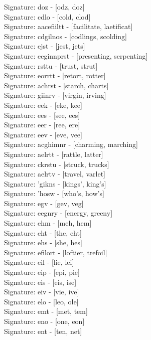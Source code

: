 Signature: {doz} - [odz, doz] \\
Signature: {cdlo} - [cold, clod] \\
Signature: {aacefiiltt} - [facilitate, laetificat] \\
Signature: {cdgilnos} - [codlings, scolding] \\
Signature: {ejst} - [jest, jets] \\
Signature: {eeginnprst} - [presenting, serpenting] \\
Signature: {rsttu} - [trust, strut] \\
Signature: {eorrtt} - [retort, rotter] \\
Signature: {achrst} - [starch, charts] \\
Signature: {giinrv} - [virgin, irving] \\
Signature: {eek} - [eke, kee] \\
Signature: {ees} - [see, ees] \\
Signature: {eer} - [ree, ere] \\
Signature: {eev} - [eve, vee] \\
Signature: {acghimnr} - [charming, marching] \\
Signature: {aelrtt} - [rattle, latter] \\
Signature: {ckrstu} - [struck, trucks] \\
Signature: {aelrtv} - [travel, varlet] \\
Signature: {'gikns} - [kings', king's] \\
Signature: {'hosw} - [who's, how's] \\
Signature: {egv} - [gev, veg] \\
Signature: {eegnry} - [energy, greeny] \\
Signature: {ehm} - [meh, hem] \\
Signature: {eht} - [the, eht] \\
Signature: {ehs} - [she, hes] \\
Signature: {efilort} - [loftier, trefoil] \\
Signature: {eil} - [lie, lei] \\
Signature: {eip} - [epi, pie] \\
Signature: {eis} - [eis, ise] \\
Signature: {eiv} - [vie, ive] \\
Signature: {elo} - [leo, ole] \\
Signature: {emt} - [met, tem] \\
Signature: {eno} - [one, eon] \\
Signature: {ent} - [ten, net] \\

